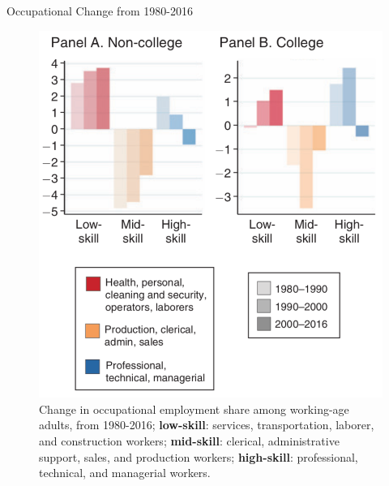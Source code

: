 \documentclass{beamer}
\begin{document}
\begin{frame}{Occupational Change from 1980-2016}

\begin{figure}
	\begin{center}
		\includegraphics[scale=0.35]{Figures/Fig2_OccChange}
		\caption{Change in occupational employment share among working-age adults, from 1980-2016; \newline \tiny{\textbf{low-skill}: services, transportation, laborer, and construction workers; \newline \textbf{mid-skill}: clerical, administrative support, sales, and production workers; \newline \textbf{high-skill}: professional, technical, and managerial workers.}}
	\end{center}
	
\end{figure}

\end{frame}
\end{document}
